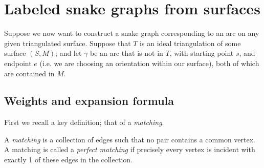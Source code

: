 \section{Labeled snake graphs from surfaces}
Suppose we now want to construct a snake graph corresponding to an arc on any given triangulated surface. Suppose that $T$ is an ideal triangulation of some surface $(S,M)$; and let $\gamma$ be an arc that is not in $T$, with starting point $s$, and endpoint $e$ (i.e. we are choosing an orientation within our surface), both of which are contained in $M$. 
\subsection{Weights and expansion formula}
First we recall a key definition; that of a \emph{matching}. 
\begin{definition}
    A \emph{matching} is a collection of edges such that no pair contains a common vertex. A matching is called a \emph{perfect matching} if precisely every vertex is incident with exactly 1 of these edges in the collection. 
\end{definition}
